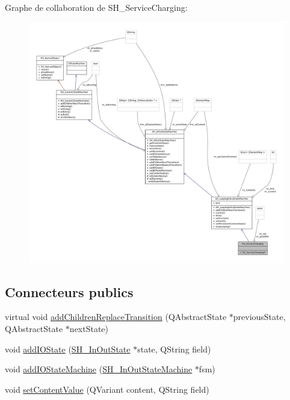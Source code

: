 Graphe de collaboration de S\-H\-\_\-\-Service\-Charging\-:
\nopagebreak
\begin{figure}[H]
\begin{center}
\leavevmode
\includegraphics[width=350pt]{classSH__ServiceCharging__coll__graph}
\end{center}
\end{figure}
\subsection*{Connecteurs publics}
\begin{DoxyCompactItemize}
\item 
virtual void \hyperlink{classSH__InOutStateMachine_ae0f3b4622d2c70884bb224dee86e95c0}{add\-Children\-Replace\-Transition} (Q\-Abstract\-State $\ast$previous\-State, Q\-Abstract\-State $\ast$next\-State)
\item 
void \hyperlink{classSH__InOutStateMachine_a2528cffddbe6f98c32ebef41423c0118}{add\-I\-O\-State} (\hyperlink{classSH__InOutState}{S\-H\-\_\-\-In\-Out\-State} $\ast$state, Q\-String field)
\item 
void \hyperlink{classSH__InOutStateMachine_a6f65dff277508e650eb697628c857b19}{add\-I\-O\-State\-Machine} (\hyperlink{classSH__InOutStateMachine}{S\-H\-\_\-\-In\-Out\-State\-Machine} $\ast$fsm)
\item 
void \hyperlink{classSH__InOutStateMachine_a9ab1534306b2bdb62743d4bcefe40c17}{set\-Content\-Value} (Q\-Variant content, Q\-String field)
\end{DoxyCompactItemize}
